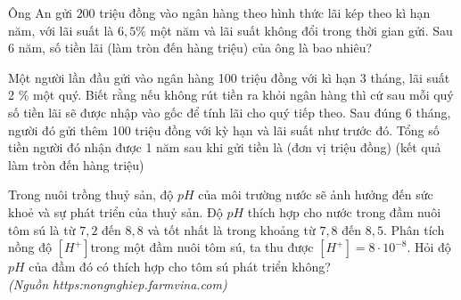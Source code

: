 \begin{ex}%
	Ông An gửi $200$ triệu đồng vào ngân hàng theo hình thức lãi kép theo kì hạn năm, với lãi suất là $6{,}5 \%$ một năm và lãi suất không đổi trong thời gian gửi. Sau $6$ năm, số tiền lãi (làm tròn đến hàng triệu) của ông là bao nhiêu? 
\end{ex}

\begin{ex}%
	Một người lần đầu gửi vào ngân hàng 100 triệu đồng với kì hạn 3 tháng, lãi suất 2 \% một quý. Biết rằng nếu không rút tiền ra khỏi ngân hàng thì cứ sau mỗi quý số tiền lãi sẽ được nhập vào gốc để tính lãi cho quý tiếp theo. Sau đúng 6 tháng, người đó gửi thêm 100 triệu đồng với kỳ  hạn và lãi suất như trước đó. Tổng số tiền người đó nhận được 1 năm sau khi gửi tiền là (đơn vị triệu đồng) (kết quả làm tròn đến hàng triệu)
\end{ex}



\begin{ex}%
	Trong nuôi trồng thuỷ sản, độ ${pH}$ của môi trường nước sẽ ảnh hưởng đến sức khoẻ và sự phát triển của thuỷ sản. Độ ${pH}$ thích hợp cho nước trong đầm nuôi tôm sú là từ $7{,}2$ đến $8{,}8$ và tốt nhất là trong khoảng từ $7{,}8$ đến $8{,}5$. Phân tích nồng độ $\left[H^+\right]$trong một đầm nuôi tôm sú, ta thu được $\left[H^+\right]=8\cdot 10^{-8}$. Hỏi độ $pH$  của đầm đó có thích hợp cho tôm sú phát triển không?\\
	\textit{(Nguồn https:nongnghiep.farmvina.com)} 
\end{ex}

